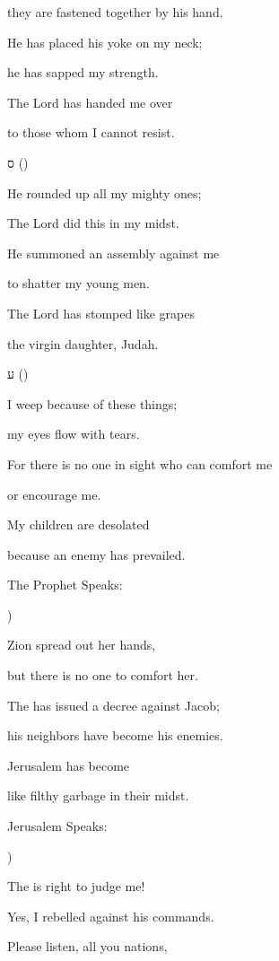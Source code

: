 {\par }{\Q they are fastened together by his hand.
\par }{\Q He has placed his yoke on my neck;
\par }{\Q he has sapped my strength.
\par }{\Q The Lord has handed me over
\par }{\Q to those whom I cannot resist.
\par }{\SH ס ({})
\par }{\Q {}He rounded up all my mighty ones;
\par }{\Q The Lord did this in my midst.
\par }{\Q He summoned an assembly against me
\par }{\Q to shatter my young men.
\par }{\Q The Lord has stomped like grapes
\par }{\Q the virgin daughter, Judah.
\par }{\SH ע ({})
\par }{\Q {}I weep because of these things;
\par }{\Q my eyes flow with tears.
\par }{\Q For there is no one in sight who can comfort me
\par }{\Q or encourage me.
\par }{\Q My children are desolated
\par }{\Q because an enemy has prevailed.
\par }{\SH The Prophet Speaks:
\par }{\SH 
{})
\par }{\Q {}Zion
spread out her
hands,
\par }{\Q but there is
no one to
comfort her.
\par }{\Q The
{} has issued a
decree against
Jacob;
\par }{\Q his
neighbors have
become his
enemies.
\par }{\Q Jerusalem has become
\par }{\Q like
filthy garbage in their midst.
\par }{\SH Jerusalem Speaks:
\par }{\SH 
{})
\par }{\Q {}The
{} is
right to judge me!

\par }{\Q Yes, I
rebelled against his
commands.
\par }{\Q Please
listen,
all you
nations,

}
